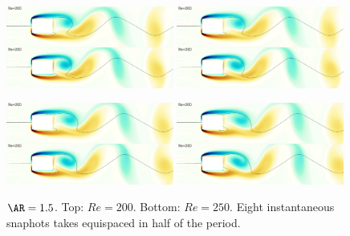 \begin{figure}
  \includegraphics[width=0.49\textwidth]{./fig/AR1p5/snap/snap.0030.png}
  \includegraphics[width=0.49\textwidth]{./fig/AR1p5/snap/snap.0035.png}
  \includegraphics[width=0.49\textwidth]{./fig/AR1p5/snap/snap.0040.png}
  \includegraphics[width=0.49\textwidth]{./fig/AR1p5/snap/snap.0045.png}  
  \caption{$\AR=1.5$. Top: $Re=200$. Bottom: $Re=250$. Eight instantaneous snaphots takes equispaced in half of the period.}
\end{figure}  
      

